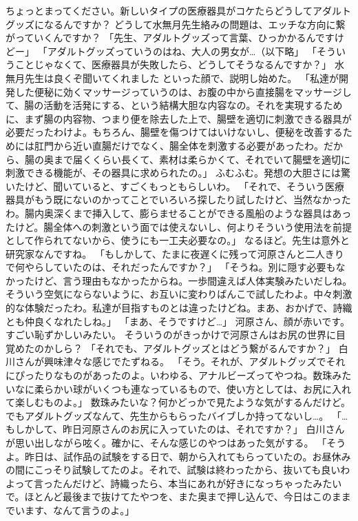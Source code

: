 ちょっとまってください。新しいタイプの医療器具がコケたらどうしてアダルトグッズになるんですか？
どうして水無月先生絡みの問題は、エッチな方向に繋がっていくんですか？
「先生、アダルトグッズって言葉、ひっかかるんですけどー」
「アダルトグッズっていうのはね、大人の男女が…（以下略」
「そういうことじゃなくて、医療器具が失敗したら、どうしてそうなるんですか？」
水無月先生は良くぞ聞いてくれました といった顔で、説明し始めた。
「私達が開発した便秘に効くマッサージっていうのは、お腹の中から直接腸をマッサージして、腸の活動を活発にする、という結構大胆な内容なの。それを実現するために、まず腸の内容物、つまり便を除去した上で、腸壁を適切に刺激できる器具が必要だったわけよ。もちろん、腸壁を傷つけてはいけないし、便秘を改善するためには肛門から近い直腸だけでなく、腸全体を刺激する必要があったわ。だから、腸の奥まで届くくらい長くて、素材は柔らかくて、それでいて腸壁を適切に刺激できる機能が、その器具に求められたの。」
ふむふむ。発想の大胆さには驚いたけど、聞いていると、すごくもっともらしいわ。
「それで、そういう医療器具がもう既にないのかってことでいろいろ探したり試したけど、当然なかったわ。腸内奥深くまで挿入して、膨らませることができる風船のような器具はあったけど。腸全体への刺激という面では使えないし、何よりそういう使用法を前提として作られてないから、使うにも一工夫必要なの。」
なるほど。先生は意外と研究家なんですね。
「もしかして、たまに夜遅くに残って河原さんと二人きりで何やらしていたのは、それだったんですか？」
「そうね。別に隠す必要もなかったけど、言う理由もなかったからね。一歩間違えば人体実験みたいだしね。そういう空気にならないように、お互いに変わりばんこで試したわよ。中々刺激的な体験だったわ。私達が目指すものとは違ったけどね。まあ、おかげで、詩織とも仲良くなれたしね。」
「まあ、そうですけど…」
河原さん、顔が赤いです。すごい恥ずかしいみたい。
そういうのがきっかけで河原さんはお尻の世界に目覚めたのかしら？
「それでも、アダルトグッズとはどう繋がるんですか？」
白川さんが興味津々な感じでたずねる。
「そう。それが、アダルトグッズでそれにぴったりなものがあったのよ。いわゆる、アナルビーズってやつね。数珠みたいなに柔らかい球がいくつも連なっているもので、使い方としては、お尻に入れて楽しむものよ。」
数珠みたいな？何かどっかで見たような気がするんだけど。でもアダルトグッズなんて、先生からもらったバイブしか持ってないし…。
「…もしかして、昨日河原さんのお尻に入っていたのは、それですか？」
白川さんが思い出しながら呟く。確かに、そんな感じのやつはあった気がする。
「そうよ。昨日は、試作品の試験をする日で、朝から入れてもらっていたの。お昼休みの間にこっそり試験してたのよ。それで、試験は終わったから、抜いても良いわよって言ったんだけど、詩織ったら、本当にあれが好きになっちゃったみたいで。ほとんど最後まで抜けてたやつを、また奥まで押し込んで、今日はこのままでいます、なんて言うのよ。」
